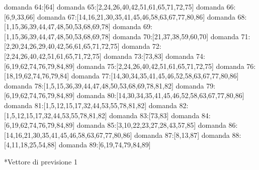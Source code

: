 domanda 64:[64]
domanda 65:[2,24,26,40,42,51,61,65,71,72,75]
domanda 66:[6,9,33,66]
domanda 67:[14,16,21,30,35,41,45,46,58,63,67,77,80,86]
domanda 68:[1,15,36,39,44,47,48,50,53,68,69,78]
domanda 69:[1,15,36,39,44,47,48,50,53,68,69,78]
domanda 70:[21,37,38,59,60,70]
domanda 71:[2,20,24,26,29,40,42,56,61,65,71,72,75]
domanda 72:[2,24,26,40,42,51,61,65,71,72,75]
domanda 73:[73,83]
domanda 74:[6,19,62,74,76,79,84,89]
domanda 75:[2,24,26,40,42,51,61,65,71,72,75]
domanda 76:[18,19,62,74,76,79,84]
domanda 77:[14,30,34,35,41,45,46,52,58,63,67,77,80,86]
domanda 78:[1,5,15,36,39,44,47,48,50,53,68,69,78,81,82]
domanda 79:[6,19,62,74,76,79,84,89]
domanda 80:[14,30,34,35,41,45,46,52,58,63,67,77,80,86]
domanda 81:[1,5,12,15,17,32,44,53,55,78,81,82]
domanda 82:[1,5,12,15,17,32,44,53,55,78,81,82]
domanda 83:[73,83]
domanda 84:[6,19,62,74,76,79,84,89]
domanda 85:[3,10,22,23,27,28,43,57,85]
domanda 86:[14,16,21,30,35,41,45,46,58,63,67,77,80,86]
domanda 87:[8,13,87]
domanda 88:[4,11,18,25,54,88]
domanda 89:[6,19,74,79,84,89]

*Vettore di previsione 1

